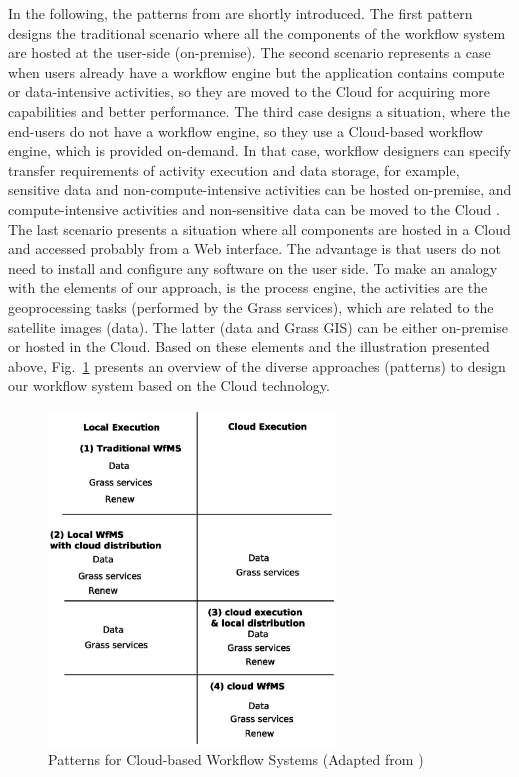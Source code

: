 %
%
%
%
In the following, the patterns from \cite{han10,leyman09} are shortly introduced.
%
%
%
The first pattern designs the traditional scenario where all the components of the workflow system are hosted at the user-side (on-premise).
%
The second scenario represents a case when users already have a workflow engine but the application contains compute or data-intensive activities, so they are moved to the Cloud for acquiring more capabilities and better performance.
%
The third case designs a situation, where the end-users do not have a workflow engine, so they use a Cloud-based workflow engine, which is provided on-demand.
%
In that case, workflow designers can specify transfer requirements of activity execution and data storage, for example, sensitive data and non-compute-intensive activities can be hosted on-premise, and compute-intensive activities and non-sensitive data can be moved to the Cloud \cite{han10}.
%
%
The last scenario presents a situation where all components are hosted in a Cloud and accessed probably from a Web interface.
%
The advantage is that users do not need to install and configure any software on the user side.
%
%
%
%
%
To make an analogy with the elements of our approach, \Renew{} is the process engine, the activities are the geoprocessing tasks (performed by the Grass services), which are related to the satellite images (data).
%
The latter (data and Grass GIS) can be either on-premise or hosted in the Cloud.
%
Based on these elements and the illustration presented above, Fig.~\ref{fig:cloudpatterns} presents an overview of the diverse approaches (patterns) to design our workflow system based on the Cloud technology.
%
\begin{figure}[!t]
    \centering
 \includegraphics[width=0.68\textwidth,height=0.35\textheight]{images/CloudGrassPatterns}
\caption{Patterns for Cloud-based Workflow Systems (Adapted from \cite{han10})}
\label{fig:cloudpatterns}
\end{figure}



